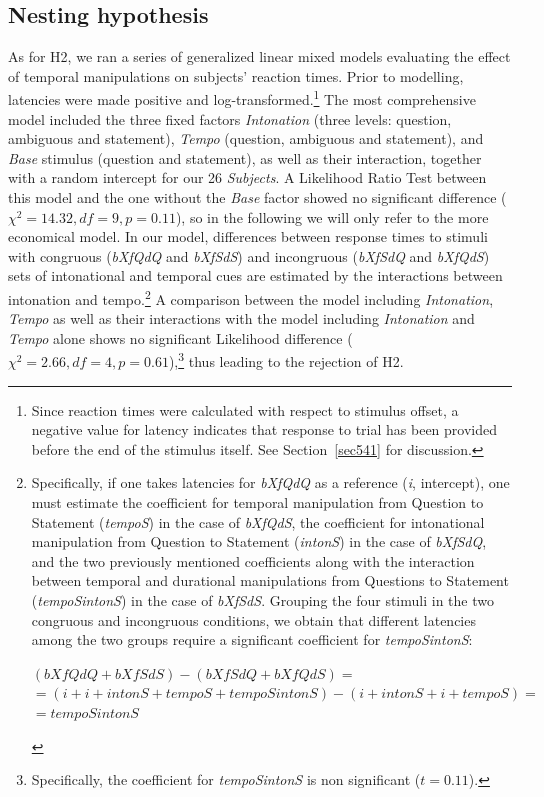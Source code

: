 \subsection{Nesting hypothesis}\label{sec532}
As for H2, we ran a series of generalized linear mixed models evaluating the effect of temporal manipulations on subjects' reaction times. Prior to modelling, latencies were made positive and log-transformed.\footnote{Since reaction times were calculated with respect to stimulus offset, a negative value for latency indicates that response to trial has been provided before the end of the stimulus itself. See Section~\ref{sec541} for discussion.} The most comprehensive model included the three fixed factors \textit{Intonation} (three levels: question, ambiguous and statement), \textit{Tempo} (question, ambiguous and statement), and \textit{Base} stimulus (question and statement), as well as their interaction, together with a random intercept for our 26 \textit{Subjects}. A Likelihood Ratio Test between this model and the one without the \textit{Base} factor showed no significant difference ($\chi^{2}=14.32, df=9, p=0.11$), so in the following we will only refer to the more economical model.
In our model, differences between response times to stimuli with congruous (\textit{bXfQdQ} and \textit{bXfSdS}) and incongruous (\textit{bXfSdQ} and \textit{bXfQdS}) sets of intonational and temporal cues are estimated by the interactions between intonation and tempo.\footnote{Specifically, if one takes latencies for \textit{bXfQdQ} as a reference (\textit{i}, intercept), one must estimate the coefficient for temporal manipulation from Question to Statement (\textit{tempoS}) in the case of \textit{bXfQdS}, the coefficient for intonational manipulation from Question to Statement (\textit{intonS}) in the case of \textit{bXfSdQ}, and the two previously mentioned coefficients along with the interaction between temporal and durational manipulations from Questions to Statement (\textit{tempoSintonS}) in the case of \textit{bXfSdS}. Grouping the four stimuli in the two congruous and incongruous conditions, we obtain that different latencies among the two groups require a significant coefficient for \textit{tempoSintonS}:
\begin{center}
$(bXfQdQ + bXfSdS) - (bXfSdQ + bXfQdS) =$\\
$= (i + i + intonS + tempoS + tempoSintonS) - (i + intonS + i + tempoS) =$\\
$= tempoSintonS$
\end{center}} A comparison between the model including \textit{Intonation}, \textit{Tempo} as well as their interactions with the model including \textit{Intonation} and \textit{Tempo} alone shows no
\enlargethispage{1em}
significant Likelihood difference ($\chi^{2}=2.66, df=4, p=0.61$),\footnote{Specifically, the coefficient 
for \textit{tempoSintonS} is non significant ($t=0.11$).} thus leading to the rejection of H2.

